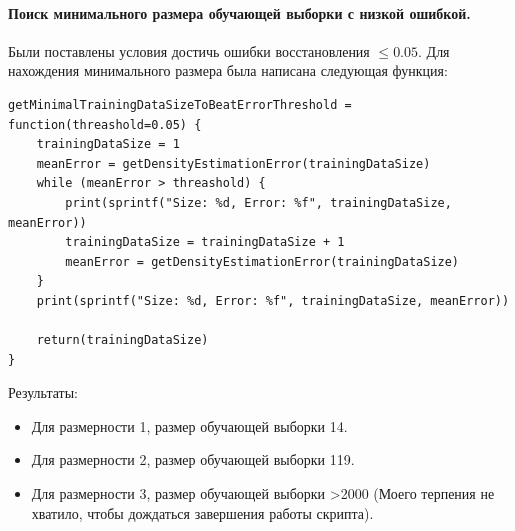 \documentclass[12pt]{article}
\begin{document}
\paragraph{Поиск минимального размера обучающей выборки с низкой ошибкой.}
Были поставлены условия достичь ошибки восстановления $ \le 0.05 $. Для
нахождения минимального размера была написана следующая функция:

\begin{verbatim}
getMinimalTrainingDataSizeToBeatErrorThreshold = function(threashold=0.05) {
    trainingDataSize = 1
    meanError = getDensityEstimationError(trainingDataSize)
    while (meanError > threashold) {
        print(sprintf("Size: %d, Error: %f", trainingDataSize, meanError))
        trainingDataSize = trainingDataSize + 1
        meanError = getDensityEstimationError(trainingDataSize)
    }
    print(sprintf("Size: %d, Error: %f", trainingDataSize, meanError))

    return(trainingDataSize)
}
\end{verbatim}

Результаты:
\begin{itemize}
    \item Для размерности 1, размер обучающей выборки 14.
    \item Для размерности 2, размер обучающей выборки 119.
    \item Для размерности 3, размер обучающей выборки >2000
          (Моего терпения не хватило, чтобы дождаться завершения работы скрипта).
\end{itemize}
\end{document}
